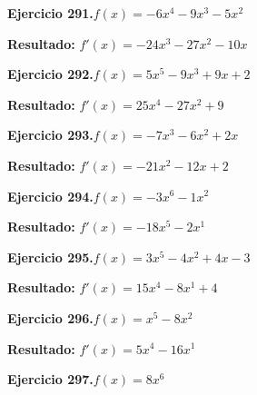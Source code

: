 \documentclass[10pt,a4paper]{article}
\begin{document}
\begin{ejbox}
\textbf{Ejercicio 291.}\quad $f(x) = -6x^4 -9x^3 -5x^2$
\end{ejbox}

\begin{solbox}
\textbf{Resultado:} \(\displaystyle f'(x) = -24x^3 -27x^2 -10x\)
\end{solbox}

\newpage
\begin{ejbox}
\textbf{Ejercicio 292.}\quad $f(x) = 5x^{5} -9x^{3} +9x +2$
\end{ejbox}

\begin{solbox}
\textbf{Resultado:} \(\displaystyle f'(x) = 25x^{4} -27x^{2} +9\)
\end{solbox}

\begin{ejbox}
\textbf{Ejercicio 293.}\quad $f(x) = -7x^3 -6x^2 +2x$
\end{ejbox}

\begin{solbox}
\textbf{Resultado:} \(\displaystyle f'(x) = -21x^2 -12x +2\)
\end{solbox}

\begin{ejbox}
\textbf{Ejercicio 294.}\quad $f(x) = -3x^{6} -1x^{2}$
\end{ejbox}

\begin{solbox}
\textbf{Resultado:} \(\displaystyle f'(x) = -18x^{5} -2x^{1}\)
\end{solbox}

\newpage
\begin{ejbox}
\textbf{Ejercicio 295.}\quad $f(x) = 3x^{5} -4x^{2} +4x -3$
\end{ejbox}

\begin{solbox}
\textbf{Resultado:} \(\displaystyle f'(x) = 15x^{4} -8x^{1} +4\)
\end{solbox}

\begin{ejbox}
\textbf{Ejercicio 296.}\quad $f(x) = x^{5} -8x^{2}$
\end{ejbox}

\begin{solbox}
\textbf{Resultado:} \(\displaystyle f'(x) = 5x^{4} -16x^{1}\)
\end{solbox}

\begin{ejbox}
\textbf{Ejercicio 297.}\quad $f(x) = 8x^{6}$
\end{ejbox}
\end{document}
